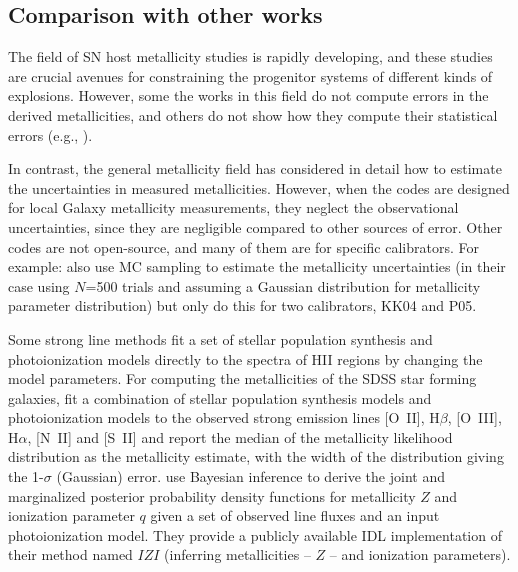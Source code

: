 \documentclass{emulateapj}
\newcommand{\ha}{\ensuremath{\mathrm{H}\alpha}}
\newcommand{\hb}{\ensuremath{\mathrm{H}\beta}}
\begin{document}

\subsection{Comparison with other works}



The field of SN host metallicity studies is rapidly developing, and
these studies are crucial avenues for constraining the progenitor
systems of different kinds of explosions. However, some the works in
this field do not compute errors in the derived metallicities, and
others do not show how they compute their statistical errors (e.g.,
\citealt{anderson10,leloudas11,sanders12,leloudas14}). %

In contrast, the general metallicity field has considered in detail
how to estimate the uncertainties in measured metallicities. However,
when the codes are designed for local Galaxy metallicity measurements,
they neglect the observational uncertainties, since they are
negligible compared to other sources of error. Other codes are not
open-source, and many of them are for specific calibrators. For
example: \citet{moustakas10} also use MC sampling to estimate the
metallicity uncertainties (in their case using $N$=500 trials and
assuming a Gaussian distribution for metallicity parameter
distribution) but only do this for two calibrators, KK04 and P05.

Some strong line methods fit a set of stellar population synthesis and
photoionization models directly to the spectra of HII regions by
changing the model parameters. For computing the metallicities of the
SDSS star forming galaxies, \citet{tremonti04} fit a combination of
stellar population synthesis models and photoionization models to the
observed strong emission lines [O~II], $\hb$, [O~III], $\ha$, [N~II]
and [S~II] and report the median of the metallicity likelihood
distribution as the metallicity estimate, with the width of the
distribution giving the 1-$\sigma$ (Gaussian) error.  \citet{blanc15}
use Bayesian inference to derive the joint and marginalized posterior
probability density functions for metallicity $Z$ and ionization
parameter $q$ given a set of observed line fluxes and an input
photoionization model. They provide a publicly available IDL
implementation of their method named $IZI$ (inferring metallicities --
$Z$ -- and ionization parameters).
\end{document}
